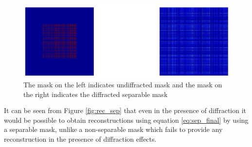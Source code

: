 \begin{figure}[ht]
\includegraphics[width=\linewidth]{pics/diffracted_mask}
\caption{The mask on the left indicates undiffracted mask and the mask on the right indicates the diffracted separable mask}
\label{fig:diff_separable}
\end{figure}

It can be seen from Figure \ref{fig:rec_sep} that even in the presence of diffraction it would be possible to obtain reconstructions using equation \ref{eq:sep_final} by using a separable mask, unlike a non-separable mask which fails to provide any reconstruction in the presence of diffraction effects. 
